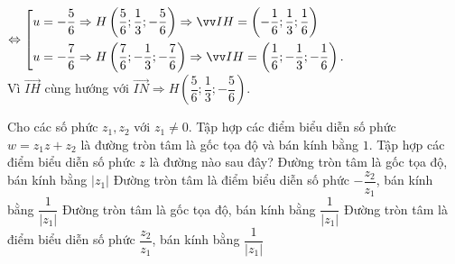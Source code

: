 \begin{ex}
{		$\Leftrightarrow \hoac{&u=-\dfrac{5}{6}\Rightarrow H\left( \dfrac{5}{6}; \dfrac{1}{3}; -\dfrac{5}{6} \right) \Rightarrow \overrightarrow{IH} = \left(-\dfrac{1}{6};\dfrac{1}{3}; \dfrac{1}{6} \right) \\ & u = -\dfrac{7}{6}\Rightarrow  H\left( \dfrac{7}{6}; -\dfrac{1}{3}; -\dfrac{7}{6} \right)\Rightarrow \overrightarrow{IH} = \left(\dfrac{1}{6}; -\dfrac{1}{3}; -\dfrac{1}{6} \right).}$\\
		Vì $\overrightarrow{IH}$ cùng hướng với $\overrightarrow{IN} \Rightarrow H\left( \dfrac{5}{6}; \dfrac{1}{3}; -\dfrac{5}{6} \right)$.
	}
\end{ex}

\begin{ex}
	Cho các số phức $z_1,z_2$ với $z_1\ne 0$. Tập hợp các điểm biểu diễn số phức $w=z_1z+z_2$ là đường tròn tâm là gốc tọa độ và bán kính bằng $1$. Tập hợp các điểm biểu diễn số phức $z$ là đường nào sau đây?
	\choice
	{Đường tròn tâm là gốc tọa độ, bán kính bằng $\vert z_1 \vert$}
	{\True Đường tròn tâm là điểm biểu diễn số phức $-\dfrac{z_2}{z_1}$, bán kính bằng $\dfrac{1}{\vert z_1 \vert}$}
	{Đường tròn tâm là gốc tọa độ, bán kính bằng $\dfrac{1}{\vert z_1 \vert}$ }
	{Đường tròn tâm là điểm biểu diễn số phức $\dfrac{z_2}{z_1}$, bán kính bằng $\dfrac{1}{\vert z_1 \vert}$ }
\end{ex}

